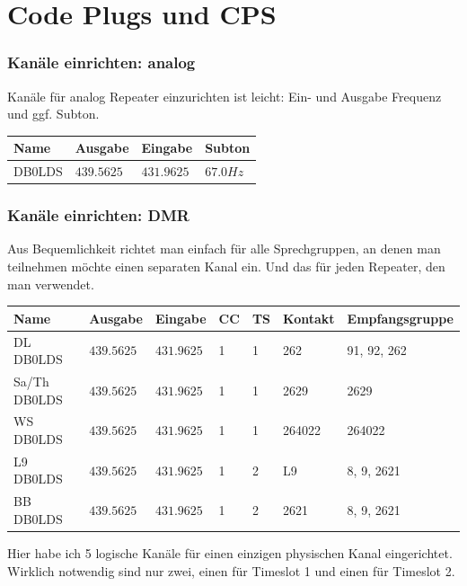 \documentclass[aspectratio=169]{beamer}
\begin{document}
\section{Code Plugs und CPS}
\begin{frame}\frametitle{Kanäle einrichten: analog}
 Kanäle für analog Repeater einzurichten ist leicht: Ein- und Ausgabe Frequenz und ggf. Subton.
\begin{center}
 \begin{tabular}{l|l|l|l}
 Name & Ausgabe & Eingabe & Subton \\ \hline
 DB0LDS & $439.5625$ & $431.9625$ & $67.0Hz$ \\
 \end{tabular}
\end{center}
\end{frame}

\begin{frame}\frametitle{Kanäle einrichten: DMR}
Aus Bequemlichkeit richtet man einfach für alle Sprechgruppen, an denen man teilnehmen möchte einen separaten Kanal ein. Und das für jeden Repeater, den man verwendet. 
\vspace{0.5cm}
\begin{center}
 \begin{tabular}{l|l|l|l|l|l|l}
 Name & Ausgabe & Eingabe & CC & TS & Kontakt & Empfangsgruppe \\ \hline
 DL DB0LDS & $439.5625$ & $431.9625$ & 1 & 1 & 262 & 91, 92, 262 \\
 Sa/Th DB0LDS & $439.5625$ & $431.9625$ & 1 & 1 & 2629 & 2629 \\
 WS DB0LDS & $439.5625$ & $431.9625$ & 1 & 1 & 264022 & 264022 \\
 L9 DB0LDS & $439.5625$ & $431.9625$ & 1 & 2 & L9 & 8, 9, 2621 \\
 BB DB0LDS & $439.5625$ & $431.9625$ & 1 & 2 & 2621 & 8, 9, 2621 \\
 \end{tabular}
\end{center}
\vspace{.5cm}
Hier habe ich 5 logische Kanäle für einen einzigen physischen Kanal eingerichtet. Wirklich notwendig sind nur zwei, einen für Timeslot 1 und einen für Timeslot 2.
\end{frame}
\end{document}
